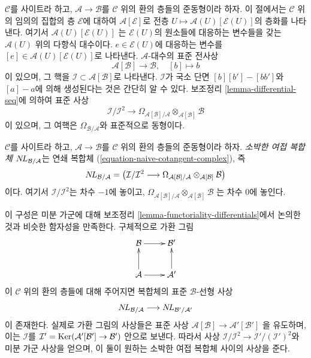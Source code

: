 \medskip\noindent
$\mathcal{C}$를 사이트라 하고, $\mathcal{A} \to \mathcal{B}$를
$\mathcal{C}$ 위의 환의 층들의 준동형이라 하자. 이 절에서는
$\mathcal{C}$ 위의 임의의 집합의 층 $\mathcal{E}$에 대하여
$\mathcal{A}[\mathcal{E}]$로 전층
$U \mapsto \mathcal{A}(U)[\mathcal{E}(U)]$의 층화를 나타낸다. 여기서
$\mathcal{A}(U)[\mathcal{E}(U)]$
는 $\mathcal{E}(U)$의 원소들에 대응하는 변수들을 갖는
$\mathcal{A}(U)$ 위의 다항식 대수이다. $e \in \mathcal{E}(U)$에
대응하는 변수를 $[e] \in \mathcal{A}(U)[\mathcal{E}(U)]$로 나타낸다.
$\mathcal{A}$-대수의 표준 전사상
\begin{equation}
\label{equation-canonical-presentation}
\mathcal{A}[\mathcal{B}] \longrightarrow \mathcal{B},\quad [b] \longmapsto b
\end{equation}
이 있으며, 그 핵을 $\mathcal{I} \subset \mathcal{A}[\mathcal{B}]$로
나타낸다. $\mathcal{I}$가 국소 단면 $[b][b'] - [bb']$와 $[a] - a$에
의해 생성된다는 것은 간단히 알 수 있다. 보조정리
\ref{lemma-differential-seq}에 의하여 표준 사상
\begin{equation}
\label{equation-naive-cotangent-complex}
\mathcal{I}/\mathcal{I}^2
\longrightarrow
\Omega_{\mathcal{A}[\mathcal{B}]/\mathcal{A}}
\otimes_{\mathcal{A}[\mathcal{B}]} \mathcal{B}
\end{equation}
이 있으며, 그 여핵은 $\Omega_{\mathcal{B}/\mathcal{A}}$와 표준적으로
동형이다.

\begin{definition}
\label{definition-naive-cotangent-complex}
$\mathcal{C}$를 사이트라 하고, $\mathcal{A} \to \mathcal{B}$를
$\mathcal{C}$ 위의 환의 층들의 준동형이라 하자.
{\it 소박한 여접 복합체} $\mathop{N\!L}\nolimits_{\mathcal{B}/\mathcal{A}}$는 연쇄 복합체
(\ref{equation-naive-cotangent-complex}), 즉
$$
\mathop{N\!L}\nolimits_{\mathcal{B}/\mathcal{A}} =
\left(\mathcal{I}/\mathcal{I}^2
\longrightarrow
\Omega_{\mathcal{A}[\mathcal{B}]/\mathcal{A}}
\otimes_{\mathcal{A}[\mathcal{B}]} \mathcal{B}\right)
$$
이다. 여기서 $\mathcal{I}/\mathcal{I}^2$는 차수 $-1$에 놓이고,
$\Omega_{\mathcal{A}[\mathcal{B}]/\mathcal{A}}
\otimes_{\mathcal{A}[\mathcal{B}]} \mathcal{B}$
는 차수 $0$에 놓인다.
\end{definition}

\noindent
이 구성은 미분 가군에 대해 보조정리
\ref{lemma-functoriality-differentials}에서 논의한 것과 비슷한 함자성을
만족한다. 구체적으로 가환 그림
\begin{equation}
\label{equation-commutative-square-sheaves}
\vcenter{
\xymatrix{
\mathcal{B} \ar[r] & \mathcal{B}' \\
\mathcal{A} \ar[u] \ar[r] & \mathcal{A}' \ar[u]
}
}
\end{equation}
이 $\mathcal{C}$ 위의 환의 층들에 대해 주어지면 복합체의 표준
$\mathcal{B}$-선형 사상
$$
\mathop{N\!L}\nolimits_{\mathcal{B}/\mathcal{A}} \longrightarrow \mathop{N\!L}\nolimits_{\mathcal{B}'/\mathcal{A}'}
$$
이 존재한다. 실제로 가환 그림의 사상들은 표준 사상
$\mathcal{A}[\mathcal{B}] \to \mathcal{A}'[\mathcal{B}']$
을 유도하며, 이는 $\mathcal{I}$를
$\mathcal{I}' = \mathop{\mathrm{Ker}}(\mathcal{A}'[\mathcal{B}'] \to \mathcal{B}')$ 안으로
보낸다. 따라서 사상
$\mathcal{I}/\mathcal{I}^2 \to \mathcal{I}'/(\mathcal{I}')^2$와 미분 가군
사상을 얻으며, 이 둘이 원하는 소박한 여접 복합체 사이의 사상을 준다.

